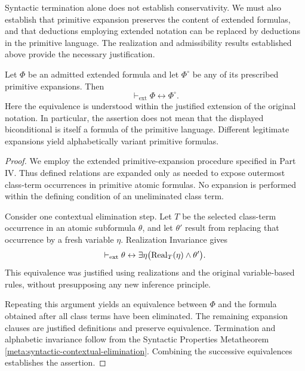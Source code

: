 
Syntactic termination alone does not establish conservativity.
We must also establish that primitive expansion preserves the
content of extended formulas, and that deductions employing
extended notation can be replaced by deductions in the
primitive language. The realization and admissibility results
established above provide the necessary justification.

\begin{metatheorem}
\label{meta:adequacy-of-primitive-expansion}
Let \(\Phi\) be an admitted extended formula and let
\(\Phi^\circ\) be any of its prescribed primitive expansions.
Then
\[
\vdash_{\mathrm{ext}}
\Phi\leftrightarrow\Phi^\circ.
\]
Here the equivalence is understood within the justified
extension of the original notation. In particular, the
assertion does not mean that the displayed biconditional
is itself a formula of the primitive language. Different
legitimate expansions yield alphabetically variant
primitive formulas.
\end{metatheorem}

\begin{proof}
We employ the extended primitive-expansion procedure
specified in Part IV. Thus defined relations are
expanded only as needed to expose outermost class-term
occurrences in primitive atomic formulas. No expansion
is performed within the defining condition of an
uneliminated class term.

Consider one contextual elimination step. Let \(T\)
be the selected class-term occurrence in an atomic
subformula \(\theta\), and let \(\theta'\) result
from replacing that occurrence by a fresh variable
\(\eta\). Realization Invariance gives
\[
\vdash_{\mathrm{ext}}
\theta\leftrightarrow
\exists\eta\bigl(
\operatorname{Real}_T(\eta)\land\theta'
\bigr).
\]
This equivalence was justified using realizations
and the original variable-based rules, without
presupposing any new inference principle.

Repeating this argument yields an equivalence between
\(\Phi\) and the formula obtained after all class terms
have been eliminated. The remaining expansion clauses
are justified definitions and preserve equivalence.
Termination and alphabetic invariance follow from the
Syntactic Properties Metatheorem
\ref{meta:syntactic-contextual-elimination}.
Combining the successive equivalences establishes
the assertion.
\end{proof}

